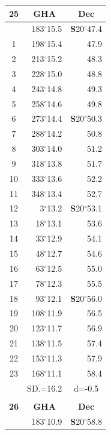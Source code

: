 \documentclass[10pt, a4paper]{report}
\begin{document}
\begin{scriptsize}
\begin{tabular*}{0.2\textwidth}[t]{@{\extracolsep{\fill}}|c|rr|}
\hline
\multicolumn{1}{|c|}{\rule{0pt}{2.6ex}\textbf{25}} & \multicolumn{1}{c}{\textbf{GHA}} & \multicolumn{1}{c|}{\textbf{Dec}}\\
\hline\rule{0pt}{2.6ex}\noindent
0 & 183$^\circ$15.5 & \textbf{S}20$^\circ$47.4\\
1 & 198$^\circ$15.4 & 47.9\\
2 & 213$^\circ$15.2 & 48.3\\
3 & 228$^\circ$15.0 & \raisebox{0.24ex}{\boldmath$\cdot$~\boldmath$\cdot$~~}48.8\\
4 & 243$^\circ$14.8 & 49.3\\
5 & 258$^\circ$14.6 & 49.8\\[2Pt]
6 & 273$^\circ$14.4 & \textbf{S}20$^\circ$50.3\\
7 & 288$^\circ$14.2 & 50.8\\
8 & 303$^\circ$14.0 & 51.2\\
9 & 318$^\circ$13.8 & \raisebox{0.24ex}{\boldmath$\cdot$~\boldmath$\cdot$~~}51.7\\
10 & 333$^\circ$13.6 & 52.2\\
11 & 348$^\circ$13.4 & 52.7\\[2Pt]
12 & 3$^\circ$13.2 & \textbf{S}20$^\circ$53.1\\
13 & 18$^\circ$13.1 & 53.6\\
14 & 33$^\circ$12.9 & 54.1\\
15 & 48$^\circ$12.7 & \raisebox{0.24ex}{\boldmath$\cdot$~\boldmath$\cdot$~~}54.6\\
16 & 63$^\circ$12.5 & 55.0\\
17 & 78$^\circ$12.3 & 55.5\\[2Pt]
18 & 93$^\circ$12.1 & \textbf{S}20$^\circ$56.0\\
19 & 108$^\circ$11.9 & 56.5\\
20 & 123$^\circ$11.7 & 56.9\\
21 & 138$^\circ$11.5 & \raisebox{0.24ex}{\boldmath$\cdot$~\boldmath$\cdot$~~}57.4\\
22 & 153$^\circ$11.3 & 57.9\\
23 & 168$^\circ$11.1 & 58.4\\
\hline
\rule{0pt}{2.4ex} & \multicolumn{1}{c}{SD.=16.2} & \multicolumn{1}{c|}{d=-0.5}\\
\hline
\multicolumn{1}{c}{}\\[-0.5ex]\hline
\multicolumn{1}{|c|}{\rule{0pt}{2.6ex}\textbf{26}} & \multicolumn{1}{c}{\textbf{GHA}} & \multicolumn{1}{c|}{\textbf{Dec}}\\
\hline\rule{0pt}{2.6ex}\noindent
0 & 183$^\circ$10.9 & \textbf{S}20$^\circ$58.8\\

\end{tabular*}
\end{scriptsize}
\end{document}
